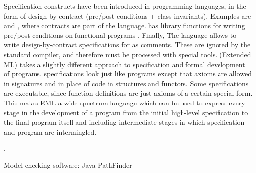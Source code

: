 Specification constructs have been introduced in programming languages, in the form
of design-by-contract (pre/post conditions + class invariants). Examples are
\eiffel{} \cite{eiffel} and \specsharp{} \cite{specsharp}, where contracts are 
part of the language. \scala{} has library functions for writing pre/post conditions 
on functional programs \cite{odersky-rv10}. Finally, The \jml{} language \cite{jml} 
allows to write design-by-contract specifications for \java{} as comments. These are 
ignored by the standard \java{} compiler, and therefore must be processed with 
special tools. \eml{} (Extended ML) \cite{sannella-eml-97} takes a slightly different approach to specification and formal development of \sml{} programs.
\eml{} specifications look just like \sml{} programs except that axioms are allowed in signatures and in place of code in structures and functors. Some \eml{} specifications are executable, since \sml{} function definitions are just axioms of a certain special form. This makes EML a wide-spectrum language which can be used to express every stage in the development of a \sml{} program from the initial high-level specification to the final program itself and including intermediate stages in which specification and program are intermingled.

.




  
  
Model checking software:
  Java PathFinder 
    \cite{havelund-jpf-00}
    \cite{havelund-visser02}  
  \cite{holzmann-spin-2004}
